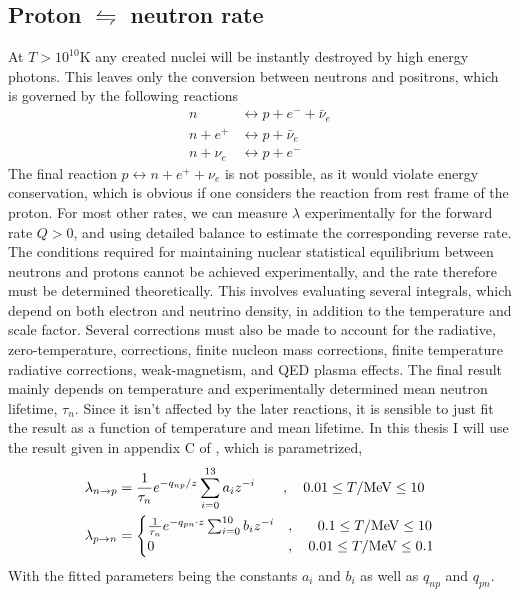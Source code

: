 \subsection{Proton $\leftrightharpoons$ neutron rate}
At $T>10^{10}$K any created nuclei will be instantly destroyed by high energy photons. This leaves only the conversion between neutrons and positrons, which is governed by the following reactions
\begin{align}
    n &\leftrightarrow p+e^-+\bar{\nu}_e\\
    n+e^+ &\leftrightarrow p+\bar{\nu}_e\\
    n+\nu_e &\leftrightarrow p+e^-
\end{align}
The final reaction $p\leftrightarrow n+e^++\nu_e$ is not possible, as it would violate energy conservation, which is obvious if one considers the reaction from rest frame of the proton. For most other rates, we can measure $\lambda$ experimentally for the forward rate $Q>0$, and using detailed balance to estimate the corresponding reverse rate. The conditions required for maintaining nuclear statistical equilibrium between neutrons and protons cannot be achieved experimentally, and the rate therefore must be determined theoretically. This involves evaluating several integrals, which depend on both electron and neutrino density, in addition to the temperature and scale factor. Several corrections must also be made to account for the radiative, zero-temperature, corrections, finite nucleon mass corrections, finite temperature radiative corrections, weak-magnetism, and QED plasma effects\cite{PRIMAT}. 
The final result mainly depends on temperature and experimentally determined mean neutron lifetime, $\tau_n$. Since it isn't affected by the later reactions, it is sensible to just fit the result as a function of temperature and mean lifetime. In this thesis I will use the result given in appendix C of \cite{Serpico_2004}, which is parametrized,
\begin{align}
    \lambda_{n\rightarrow p}&=\frac{1}{\tau_n}e^{-q_{np}/z}\sum_{i=0}^{13}a_i z^{-i}\quad\quad , \quad 0.01\leq T/\text{MeV} \leq 10 \\
    \lambda_{p\rightarrow n}&=
\begin{cases}
    \frac{1}{\tau_n}e^{-q_{pn}\cdot z}\sum_{i=0}^{10}b_i z^{-i}&,\quad\ \ 0.1\leq T/\text{MeV} \leq 10\\
        0&,\quad 0.01\leq T/\text{MeV} \leq 0.1
\end{cases}
\end{align}
With the fitted parameters being the constants $a_i$ and $b_i$ as well as $q_{np}$ and $q_{pn}$. 

